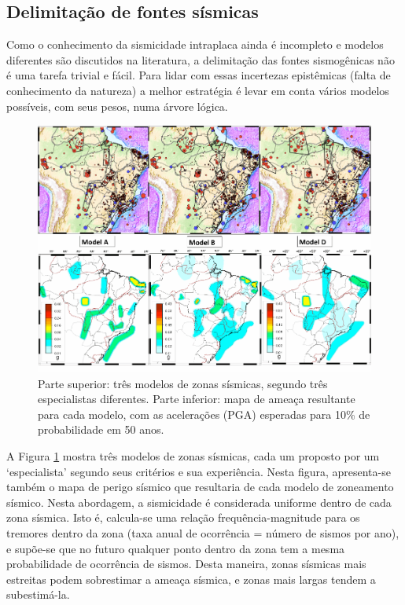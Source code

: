 \documentclass[jgrga]{agutex}
\begin{document}
\begin{article}
\subsection{Delimitação de fontes sísmicas}

Como o conhecimento da sismicidade intraplaca ainda é incompleto e modelos diferentes são discutidos na literatura, a delimitação das fontes sismogênicas não é uma tarefa trivial e fácil. Para lidar com essas incertezas epistêmicas (falta de conhecimento da natureza) a melhor estratégia é levar em conta vários modelos possíveis, com seus pesos, numa árvore lógica. 


\begin{figure}[t]
	\centerline{\includegraphics[width=\hsize]{img_zones}}
	\caption{Parte superior: três modelos de zonas sísmicas, segundo três especialistas diferentes. Parte inferior: mapa de ameaça resultante para cada modelo, com as acelerações (PGA) esperadas para 10\% de probabilidade em 50 anos.}
	\label{fig_zones}
\end{figure}

A Figura \ref{fig_zones} mostra três modelos de zonas sísmicas, cada um proposto por um `especialista' segundo seus critérios e sua experiência. Nesta figura, apresenta-se também o mapa de perigo sísmico que resultaria de cada modelo de zoneamento sísmico. Nesta abordagem, a sismicidade é considerada uniforme dentro de cada zona sísmica. Isto é, calcula-se uma relação frequência-magnitude para os tremores dentro da zona (taxa anual de ocorrência = número de sismos por ano), e supõe-se que no futuro qualquer ponto dentro da zona tem a mesma probabilidade de ocorrência de sismos. Desta maneira, zonas sísmicas mais estreitas podem sobrestimar a ameaça sísmica, e zonas mais largas tendem a subestimá-la.


\end{article}
\end{document}
